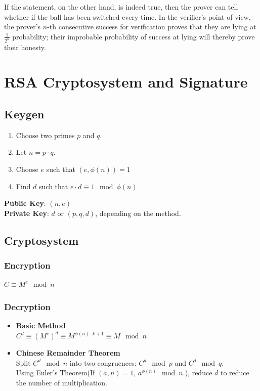 \documentclass{report}
\begin{document}
		If the statement, on the other hand, is indeed true, then the prover can tell whether if the ball has been switched every time. In the verifier's point of view, the prover's $n$-th consecutive success for verification proves that they are lying at $\frac{1}{2^n}$ probability; their improbable probability of success at lying will thereby prove their honesty.
		
	\section{RSA Cryptosystem and Signature}
		\subsection{Keygen}
		\begin{enumerate}
			\item Choose two primes $p$ and $q$.
			\item Let $n=p\cdot q$.
			\item Choose $e$ such that $(e,\phi(n))=1$
			\item Find $d$ such that $e\cdot d\equiv 1 \mod \phi(n)$
		\end{enumerate}
		\textbf{Public Key}: $(n,e)$\\
		\textbf{Private Key}: $d$ or $(p,q,d)$, depending on the method.
		
		\subsection{Cryptosystem}
			\subsubsection{Encryption}
			$C\equiv M^e \mod n$
			
			\subsubsection{Decryption}
			\begin{itemize}
				\item \textbf{Basic Method}\\
				$C^d \equiv (M^e)^d \equiv M^{\phi(n)\cdot k+1}\equiv M \mod n$
				\item \textbf{Chinese Remainder Theorem}\\
				Split $C^d \mod n$ into two congruences: $C^d \mod p$ and $C^d \mod q$.\\
				Using Euler's Theorem(If $(a,n)=1$, $a^{\phi(n)} \mod n$.), reduce $d$ to reduce the number of multiplication.
			\end{itemize}
		
\end{document}
